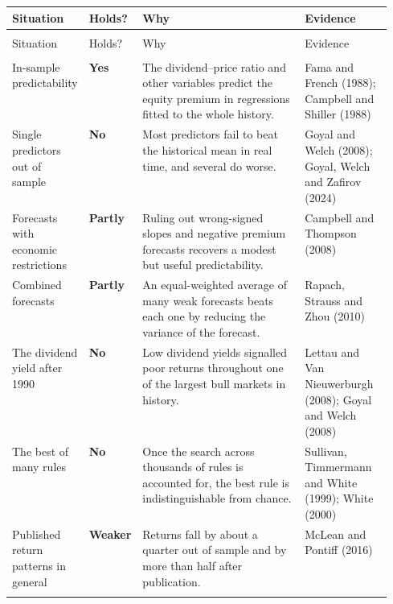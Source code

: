 \begingroup
\small
\setlength{\LTpre}{6pt}\setlength{\LTpost}{6pt}
\begin{longtable}{@{}>{\raggedright\arraybackslash}p{0.19\linewidth}>{\raggedright\arraybackslash}p{0.13\linewidth}>{\raggedright\arraybackslash}p{}>{\raggedright\arraybackslash}p{0.23\linewidth}@{}}
\toprule
Situation & Holds? & Why & Evidence \\
\midrule
\endfirsthead
\multicolumn{4}{@{}l}{\emph{(continued)}} \\
\toprule
Situation & Holds? & Why & Evidence \\
\midrule
\endhead
\midrule
\multicolumn{4}{r@{}}{\emph{(continued on the next page)}} \\
\endfoot
\bottomrule
\endlastfoot
In-sample predictability & \textbf{Yes} & The dividend--price ratio and other variables predict the equity premium in regressions fitted to the whole history. & Fama and French (1988); Campbell and Shiller (1988) \\*
\addlinespace[3pt]
Single predictors out of sample & \textbf{No} & Most predictors fail to beat the historical mean in real time, and several do worse. & Goyal and Welch (2008); Goyal, Welch and Zafirov (2024) \\*
\addlinespace[3pt]
Forecasts with economic restrictions & \textbf{Partly} & Ruling out wrong-signed slopes and negative premium forecasts recovers a modest but useful predictability. & Campbell and Thompson (2008) \\*
\addlinespace[3pt]
Combined forecasts & \textbf{Partly} & An equal-weighted average of many weak forecasts beats each one by reducing the variance of the forecast. & Rapach, Strauss and Zhou (2010) \\*
\addlinespace[3pt]
The dividend yield after 1990 & \textbf{No} & Low dividend yields signalled poor returns throughout one of the largest bull markets in history. & Lettau and Van Nieuwerburgh (2008); Goyal and Welch (2008) \\*
\addlinespace[3pt]
The best of many rules & \textbf{No} & Once the search across thousands of rules is accounted for, the best rule is indistinguishable from chance. & Sullivan, Timmermann and White (1999); White (2000) \\*
\addlinespace[3pt]
Published return patterns in general & \textbf{Weaker} & Returns fall by about a quarter out of sample and by more than half after publication. & McLean and Pontiff (2016) \\*
\end{longtable}
\addtocounter{table}{-1}%
\endgroup

